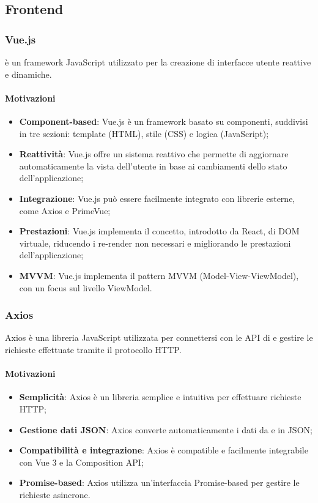\subsection{Frontend}\label{sec:tecnologie-frontend}

\subsubsection{Vue.js}\label{sec:vuejs}
\par {} è un framework JavaScript utilizzato per la creazione di interfacce utente reattive e dinamiche.
\paragraph*{Motivazioni}
\begin{itemize}
  \item \textbf{Component-based}: Vue.js è un framework basato su componenti, suddivisi in tre sezioni: template (HTML), stile (CSS) e logica (JavaScript);
  \item \textbf{Reattività}: Vue.js offre un sistema reattivo che permette di aggiornare automaticamente la vista dell'utente in base ai cambiamenti dello stato dell'applicazione;
  \item \textbf{Integrazione}: Vue.js può essere facilmente integrato con librerie esterne, come Axios e PrimeVue;
  \item \textbf{Prestazioni}: Vue.js implementa il concetto, introdotto da React, di DOM virtuale, riducendo i re-render non necessari e migliorando le prestazioni dell'applicazione;
  \item \textbf{MVVM}: Vue.js implementa il pattern MVVM (Model-View-ViewModel), con un focus sul livello ViewModel.
\end{itemize}

\subsubsection{Axios}\label{sec:axios}
\par Axios è una libreria JavaScript utilizzata per connettersi con le API di  e gestire le richieste effettuate tramite il protocollo HTTP.
\paragraph*{Motivazioni}
\begin{itemize}
  \item \textbf{Semplicità}: Axios è un libreria semplice e intuitiva per effettuare richieste HTTP;
  \item \textbf{Gestione dati JSON}: Axios converte automaticamente i dati da e in JSON;
  \item \textbf{Compatibilità e integrazione}: Axios è compatible e facilmente integrabile con Vue 3 e la Composition API;
  \item \textbf{Promise-based}: Axios utilizza un'interfaccia Promise-based per gestire le richieste asincrone.
\end{itemize}

